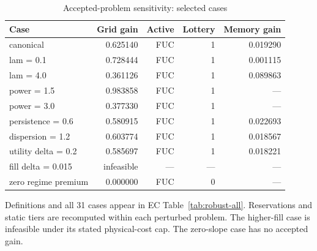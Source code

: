 \begin{table}[!ht]
\centering
\caption{Accepted-problem sensitivity: selected cases}\label{tab:robustness}
\begin{tabular}{lrrrr}\toprule
Case & Grid gain & Active & Lottery & Memory gain\\
\midrule
canonical & 0.625140 & FUC & 1 & 0.019290\\
lam = 0.1 & 0.728444 & FUC & 1 & 0.001115\\
lam = 4.0 & 0.361126 & FUC & 1 & 0.089863\\
power = 1.5 & 0.983858 & FUC & 1 & ---\\
power = 3.0 & 0.377330 & FUC & 1 & ---\\
persistence = 0.6 & 0.580915 & FUC & 1 & 0.022693\\
dispersion = 1.2 & 0.603774 & FUC & 1 & 0.018567\\
utility delta = 0.2 & 0.585697 & FUC & 1 & 0.018221\\
fill delta = 0.015 & infeasible & --- & --- & ---\\
zero regime premium & 0.000000 & FUC & 0 & ---\\
\bottomrule\end{tabular}
\par\smallskip\begin{minipage}{.98\textwidth}\small Definitions and all 31 cases appear in EC Table~\ref{tab:robust-all}. Reservations and static tiers are recomputed within each perturbed problem. The higher-fill case is infeasible under its stated physical-cost cap. The zero-slope case has no accepted gain.\end{minipage}
\end{table}
